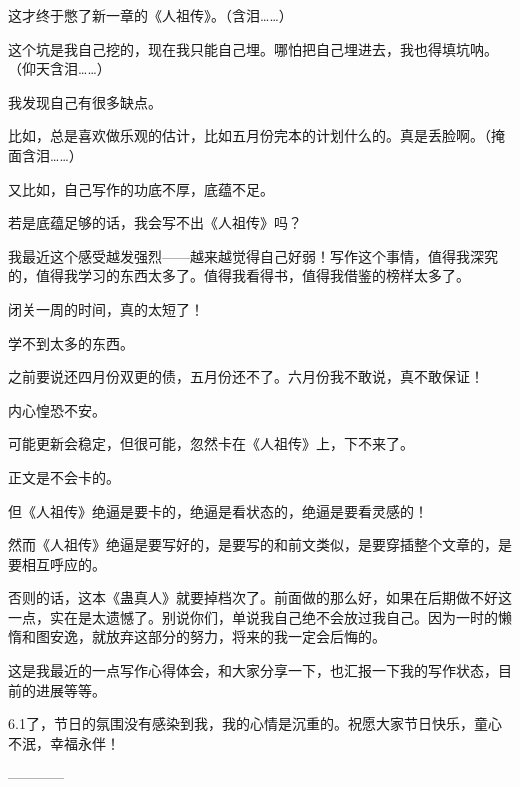 \begin{this_body}
这才终于憋了新一章的《人祖传》。（含泪……）

这个坑是我自己挖的，现在我只能自己埋。哪怕把自己埋进去，我也得填坑呐。（仰天含泪……）

我发现自己有很多缺点。

比如，总是喜欢做乐观的估计，比如五月份完本的计划什么的。真是丢脸啊。（掩面含泪……）

又比如，自己写作的功底不厚，底蕴不足。

若是底蕴足够的话，我会写不出《人祖传》吗？

我最近这个感受越发强烈——越来越觉得自己好弱！写作这个事情，值得我深究的，值得我学习的东西太多了。值得我看得书，值得我借鉴的榜样太多了。

闭关一周的时间，真的太短了！

学不到太多的东西。

之前要说还四月份双更的债，五月份还不了。六月份我不敢说，真不敢保证！

内心惶恐不安。

可能更新会稳定，但很可能，忽然卡在《人祖传》上，下不来了。

正文是不会卡的。

但《人祖传》绝逼是要卡的，绝逼是看状态的，绝逼是要看灵感的！

然而《人祖传》绝逼是要写好的，是要写的和前文类似，是要穿插整个文章的，是要相互呼应的。

否则的话，这本《蛊真人》就要掉档次了。前面做的那么好，如果在后期做不好这一点，实在是太遗憾了。别说你们，单说我自己绝不会放过我自己。因为一时的懒惰和图安逸，就放弃这部分的努力，将来的我一定会后悔的。

这是我最近的一点写作心得体会，和大家分享一下，也汇报一下我的写作状态，目前的进展等等。

6.1了，节日的氛围没有感染到我，我的心情是沉重的。祝愿大家节日快乐，童心不泯，幸福永伴！

------------

\end{this_body}

